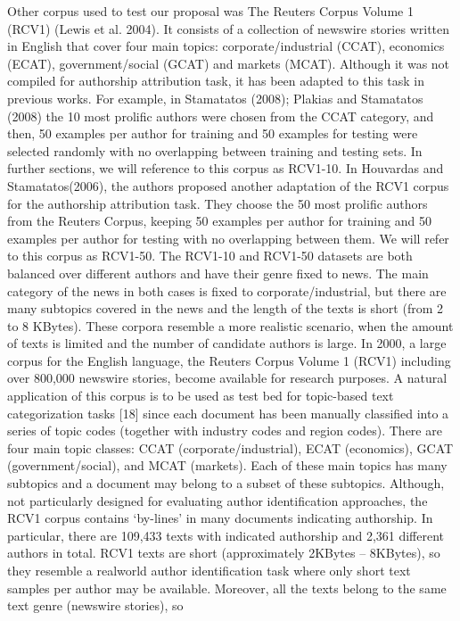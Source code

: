 Other corpus used to test our proposal was The Reuters
Corpus Volume 1 (RCV1) (Lewis et al. 2004). It consists of
a collection of newswire stories written in English that cover
four main topics: corporate/industrial (CCAT), economics
(ECAT), government/social (GCAT) and markets (MCAT).
Although it was not compiled for authorship attribution task,
it has been adapted to this task in previous works. For example, in Stamatatos (2008); Plakias and Stamatatos (2008) the
10 most prolific authors were chosen from the CCAT category, and then, 50 examples per author for training and 50
examples for testing were selected randomly with no overlapping between training and testing sets. In further sections,
we will reference to this corpus as RCV1-10.
In Houvardas and Stamatatos(2006), the authors proposed
another adaptation of the RCV1 corpus for the authorship
attribution task. They choose the 50 most prolific authors
from the Reuters Corpus, keeping 50 examples per author
for training and 50 examples per author for testing with no
overlapping between them. We will refer to this corpus as
RCV1-50.
The RCV1-10 and RCV1-50 datasets are both balanced
over different authors and have their genre fixed to news.
The main category of the news in both cases is fixed to corporate/industrial, but there are many subtopics covered in
the news and the length of the texts is short (from 2 to 8
KBytes). These corpora resemble a more realistic scenario,
when the amount of texts is limited and the number of candidate authors is large.
In 2000, a large corpus for the English language, the Reuters Corpus Volume 1
(RCV1) including over 800,000 newswire stories, become available for research
purposes. A natural application of this corpus is to be used as test bed for topic-based
text categorization tasks [18] since each document has been manually classified into a
series of topic codes (together with industry codes and region codes). There are four
main topic classes: CCAT (corporate/industrial), ECAT (economics), GCAT
(government/social), and MCAT (markets). Each of these main topics has many
subtopics and a document may belong to a subset of these subtopics. Although, not
particularly designed for evaluating author identification approaches, the RCV1
corpus contains ‘by-lines’ in many documents indicating authorship. In particular,
there are 109,433 texts with indicated authorship and 2,361 different authors in total.
RCV1 texts are short (approximately 2KBytes – 8KBytes), so they resemble a realworld author identification task where only short text samples per author may be
available. Moreover, all the texts belong to the same text genre (newswire stories), so

